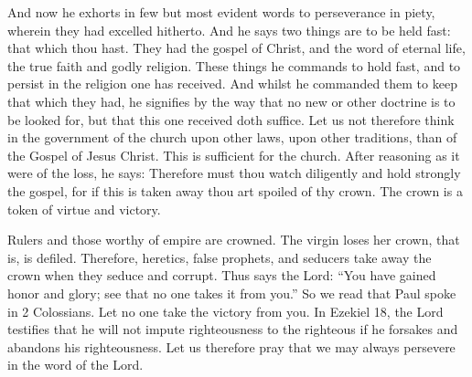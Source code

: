 And now he exhorts in few but most evident words to perseverance in piety, wherein they had excelled hitherto. And he says two things are to be held fast: that which thou hast. They had the gospel of Christ, and the word of eternal life, the true faith and godly religion. These things he commands to hold fast, and to persist in the religion one has received. And whilst he commanded them to keep that which they had, he signifies by the way that no new or other doctrine is to be looked for, but that this one received doth suffice. Let us not therefore think in the government of the church upon other laws, upon other traditions, than of the Gospel of Jesus Christ. This is sufficient for the church. After reasoning as it were of the loss, he says: Therefore must thou watch diligently and hold strongly the gospel, for if this is taken away thou art spoiled of thy crown. The crown is a token of virtue and victory.

Rulers and those worthy of empire are crowned. The virgin loses her crown, that is, is defiled. Therefore, heretics, false prophets, and seducers take away the crown when they seduce and corrupt. Thus says the Lord: “You have gained honor and glory; see that no one takes it from you.” So we read that Paul spoke in 2 Colossians. Let no one take the victory from you. In Ezekiel 18, the Lord testifies that he will not impute righteousness to the righteous if he forsakes and abandons his righteousness. Let us therefore pray that we may always persevere in the word of the Lord.
